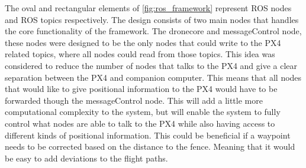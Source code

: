 \documentclass[../Head/Main.tex]{subfiles}
\begin{document}
The oval and rectangular elements of \autoref{fig:ros_framework} represent ROS nodes and ROS topics respectively. The design consists of two main nodes that handles the core functionality of the framework. The dronecore and messageControl node, these nodes were designed to be the only nodes that could write to the PX4 related topics, where all nodes could read from those topics. This idea was considered to reduce the number of nodes that talks to the PX4 and give a clear separation between the PX4 and companion computer. This means that all nodes that would like to give positional information to the PX4 would have to be forwarded though the messageControl node. This will add a little more computational complexity to the system, but will enable the system to fully control what nodes are able to talk to the PX4 while also having access to different kinds of positional information. This could be beneficial if a waypoint needs to be corrected based on the distance to the fence. Meaning that it would be easy to add deviations to the flight paths. \par
\end{document}
